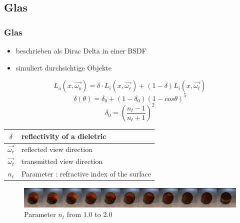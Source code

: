 \documentclass[11pt]{beamer}
\begin{document}
\subsection{Glas}
\begin{frame}[allowframebreaks]
\frametitle{Glas}

\begin{itemize}
\item beschrieben als Dirac Delta in einer BSDF
\item simuliert durchsichtige Objekte
\end{itemize}

\begin{equation}
L_o(x,\vec{\omega_o})= \delta \cdot L_i(x,\vec{\omega_r}) + (1-\delta) L_i(x,\vec{\omega_t})
\end{equation}
\begin{equation}
\delta(\theta) = \delta_0 + (1-\delta_0)(1-cos\theta)^5
\end{equation}
\begin{equation}
\delta_0 = \left(\frac{n_t-1}{n_t+1}\right)^2
\end{equation}
\begin{table}[H]
\begin{tabular}{| c | l |}
\hline
$\delta$ & reflectivity of a dieletric\\ \hline
$\vec{\omega_r}$ & reflected view direction\\ \hline
$\vec{\omega_t}$ & transmitted view direction\\ \hline
$n_t$ & Parameter : refractive index of the surface\\ \hline
\end{tabular}
\end{table}

\framebreak

\begin{figure}[H]
\caption{Parameter $n_t$ from $1.0$ to $2.0$}
\includegraphics[width=\textwidth]{../glasscomplete.png}
\end{figure}

\end{frame}
\end{document}
